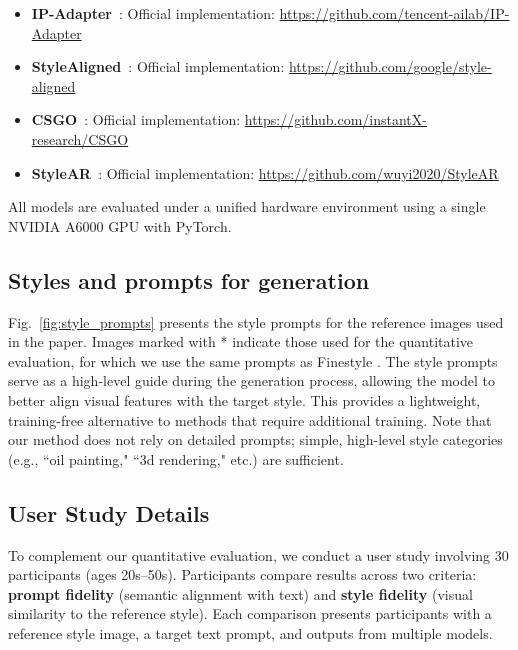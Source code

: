 \documentclass[10pt,twocolumn,letterpaper]{article}
\newcommand{\figref}[1]{Fig.~\ref{#1}}
\begin{document}
\begin{itemize}
	\item \textbf{IP-Adapter}~\cite{ye2023ipadaptertextcompatibleimage}:  
	Official implementation: \url{https://github.com/tencent-ailab/IP-Adapter}
	
	\item \textbf{StyleAligned}~\cite{hertz2024stylealignedimagegeneration}:  
	Official implementation: \url{https://github.com/google/style-aligned}
	
	\item \textbf{CSGO}~\cite{xing2024csgo}:  
	Official implementation: \url{https://github.com/instantX-research/CSGO}
	
	\item \textbf{StyleAR}~\cite{wu2025stylear}:  
	Official implementation: \url{https://github.com/wuyi2020/StyleAR}
\end{itemize}

All models are evaluated under a unified hardware environment using a single NVIDIA A6000 GPU with PyTorch. 


\subsection{Styles and prompts for generation}
\figref{fig:style_prompts} presents the style prompts for the reference images used in the paper. Images marked with * indicate those used for the quantitative evaluation, for which we use the same prompts as Finestyle \cite{zhang2024finestyle}.
The style prompts serve as a high-level guide during the generation process, allowing the model to better align visual features with the target style. This provides a lightweight, training-free alternative to methods that require additional training. Note that our method does not rely on detailed prompts; simple, high-level style categories (e.g., ``oil painting," ``3d rendering," etc.) are sufficient.

\subsection{User Study Details}

To complement our quantitative evaluation, we conduct a user study involving 30 participants (ages 20s--50s). Participants compare results across two criteria: \textbf{prompt fidelity} (semantic alignment with text) and \textbf{style fidelity} (visual similarity to the reference style). Each comparison presents participants with a reference style image, a target text prompt, and outputs from multiple models.
\end{document}
